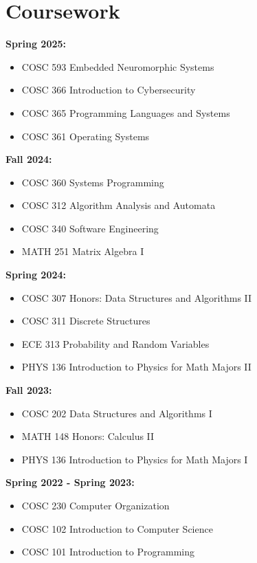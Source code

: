 \documentclass[10pt, letterpaper]{article}
\newenvironment{highlights}{
    \begin{itemize}[
        topsep=0.10 cm,
        parsep=0.10 cm,
        partopsep=0pt,
        itemsep=0pt,
        leftmargin=0.4 cm + 10pt
    ]
}{
    \end{itemize}
} %
\begin{document}
    \section{Coursework}
        \textbf{Spring 2025:}
            \begin{highlights}
                \item COSC 593 Embedded Neuromorphic Systems
                \item COSC 366 Introduction to Cybersecurity
                \item COSC 365 Programming Languages and Systems
                \item COSC 361 Operating Systems
            \end{highlights}
        \textbf{Fall 2024:}
            \begin{highlights}
                \item COSC 360 Systems Programming
                \item COSC 312 Algorithm Analysis and Automata
                \item COSC 340 Software Engineering
                \item MATH 251 Matrix Algebra I
            \end{highlights}
        \textbf{Spring 2024:}
            \begin{highlights}
                \item COSC 307 Honors: Data Structures and Algorithms II
                \item COSC 311 Discrete Structures
                \item ECE  313 Probability and Random Variables
                \item PHYS 136 Introduction to Physics for Math Majors II
            \end{highlights}
        \textbf{Fall 2023:}
            \begin{highlights}
                \item COSC 202 Data Structures and Algorithms I
                \item MATH 148 Honors: Calculus II
                \item PHYS 136 Introduction to Physics for Math Majors I
            \end{highlights}
        \textbf{Spring 2022 - Spring 2023:}
            \begin{highlights}
                \item COSC 230 Computer Organization
                \item COSC 102 Introduction to Computer Science
                \item COSC 101 Introduction to Programming
            \end{highlights}
\end{document}
